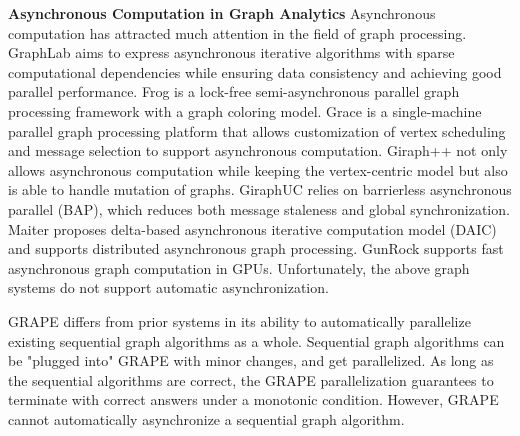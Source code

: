 \noindent\textbf{Asynchronous Computation in Graph Analytics} Asynchronous computation has attracted much attention in the field of graph processing. GraphLab \cite{Low:2012:DGF:2212351.2212354} aims to express asynchronous iterative algorithms with sparse computational dependencies while ensuring data consistency and achieving good parallel performance. Frog \cite{8017445} is a lock-free semi-asynchronous parallel graph processing framework with a graph coloring model. Grace \cite{grace} is a single-machine parallel graph processing platform that allows customization of vertex scheduling and message selection to support asynchronous computation. Giraph++ \cite{Tian:2013:TLV:2732232.2732238} not only allows asynchronous computation while keeping the vertex-centric model but also is able to handle mutation of graphs. GiraphUC \cite{Han:2015:GUB:2777598.2777604} relies on barrierless asynchronous parallel (BAP), which reduces both message staleness and global synchronization. Maiter \cite{maiter} proposes delta-based asynchronous iterative computation model (DAIC) and supports distributed asynchronous graph processing. GunRock \cite{Wang:2016:GHG:2851141.2851145} supports fast asynchronous graph computation in GPUs. Unfortunately, the above graph systems do not support automatic asynchronization.


GRAPE \cite{Fan:2017:PSG:3035918.3035942} differs from prior systems in its ability to automatically parallelize existing sequential graph algorithms as a whole. Sequential graph algorithms can be "plugged into" GRAPE with minor changes, and get parallelized. As long as the sequential algorithms are correct, the GRAPE parallelization guarantees to terminate with correct answers under a monotonic condition. However, GRAPE cannot automatically asynchronize a sequential graph algorithm.

